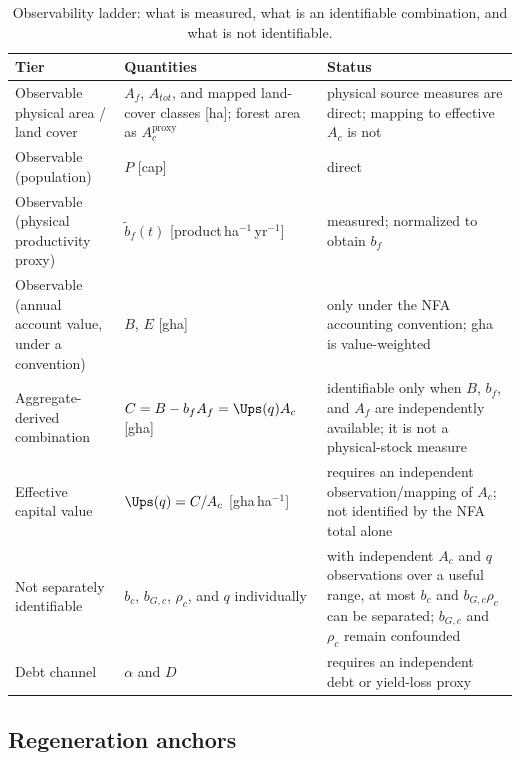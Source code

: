 \begin{table}[htbp]
\centering\small
\caption{Observability ladder: what is measured, what is an identifiable combination, and what is not identifiable.}
\label{tab:si_ladder}
\begin{tabularx}{\textwidth}{>{\raggedright\arraybackslash}p{} X >{\raggedright\arraybackslash}p{}}
\toprule
Tier & Quantities & Status \\
\midrule
Observable physical area / land cover & $A_f$, $A_{tot}$, and mapped land-cover classes [ha]; forest area as $A_c^{\mathrm{proxy}}$ & physical source measures are direct; mapping to effective $A_c$ is not \\
Observable (population) & $P$ [cap] & direct \\
Observable (physical productivity proxy) & $\tilde b_f(t)$ [product\,ha$^{-1}$\,yr$^{-1}$] & measured; normalized to obtain $b_f$ \\
Observable (annual account value, under a convention) & $B$, $E$ [gha] & only under the NFA accounting convention; gha is value-weighted \\
Aggregate-derived combination & $C=B-b_fA_f=\Ups(q)A_c$ [gha] & identifiable only when $B$, $b_f$, and $A_f$ are independently available; it is not a physical-stock measure \\
Effective capital value & $\Ups(q)=C/A_c$ [gha\,ha$^{-1}$] & requires an independent observation/mapping of $A_c$; not identified by the NFA total alone \\
Not separately identifiable & $b_c$, $b_{G,c}$, $\rho_c$, and $q$ individually & with independent $A_c$ and $q$ observations over a useful range, at most $b_c$ and $b_{G,c}\rho_c$ can be separated; $b_{G,c}$ and $\rho_c$ remain confounded \\
Debt channel & $\alpha$ and $D$ & requires an independent debt or yield-loss proxy \\
\bottomrule
\end{tabularx}
\end{table}

\subsection{Regeneration anchors}\label{si:anchors}

